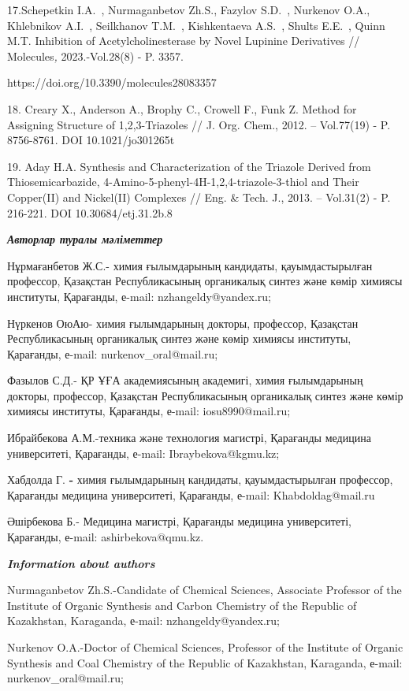 17.Schepetkin I.A.~, Nurmaganbetov Zh.S., Fazylov S.D.~, Nurkenov O.A.,
Khlebnikov A.I.~, Seilkhanov T.M.~, Kishkentaeva A.S.~, Shults E.E.~,
Quinn M.T. Inhibition of Acetylcholinesterase by Novel Lupinine
Derivatives // Molecules\emph{,} 2023.-Vol.28(8) - P. 3357.

https://doi.org/10.3390/molecules28083357

18. Creary X., Anderson A., Brophy C., Crowell F., Funk Z. Method for
Assigning Structure of 1,2,3-Triazoles // J. Org. Chem., 2012. --
Vol.77(19) - P. 8756-8761. DOI 10.1021/jo301265t

19. Aday H.A. Synthesis and Characterization of the Triazole Derived
from Thiosemicarbazide, 4-Amino-5-phenyl-4H-1,2,4-triazole-3-thiol and
Their Copper(II) and Nickel(II) Complexes // Eng. \& Tech. J., 2013. --
Vol.31(2) - P. 216-221. DOI 10.30684/etj.31.2b.8

\emph{\textbf{Авторлар туралы мәліметтер}}

Нұрмағанбетов Ж.С.- химия ғылымдарының кандидаты, қауымдастырылған
профессор, Қазақстан Республикасының органикалық синтез және көмір
химиясы институты, Қарағанды, е-mail: nzhangeldy@yandex.ru;

Нүркенов ОюАю- химия ғылымдарының докторы, профессор, Қазақстан
Республикасының органикалық синтез және көмір химиясы институты,
Қарағанды, е-mail: nurkenov\_oral@mail.ru;

Фазылов С.Д.- ҚР ҰҒА академиясының академигі, химия ғылымдарының
докторы, профессор, Қазақстан Республикасының органикалық синтез және
көмір химиясы институты, Қарағанды, е-mail: iosu8990@mail.ru;

Ибрайбекова А.М.-техника және технология магистрі, Қарағанды медицина
университеті, Қарағанды, е-mail: Ibraybekova@kgmu.kz;

Хабдолда Г. \textbf{-} химия ғылымдарының кандидаты, қауымдастырылған
профессор, Қарағанды медицина университеті, Қарағанды, е-mail:
Khabdoldag@mail.ru

Әшірбекова Б.- Медицина магистрі, Қарағанды медицина университеті,
Қарағанды, е-mail: ashirbekova@qmu.kz.

\emph{\textbf{Information about authors}}

Nurmaganbetov Zh.S.-Candidate of Chemical Sciences, Associate Professor
of the Institute of Organic Synthesis and Carbon Chemistry of the
Republic of Kazakhstan, Karaganda, е-mail: nzhangeldy@yandex.ru;

Nurkenov O.A.-Doctor of Chemical Sciences, Professor of the Institute of
Organic Synthesis and Coal Chemistry of the Republic of Kazakhstan,
Karaganda, е-mail: nurkenov\_oral@mail.ru;

